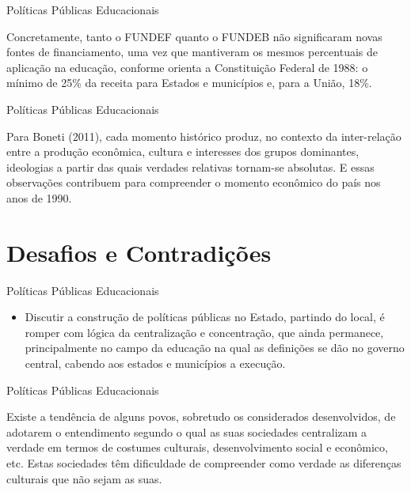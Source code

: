 \documentclass[12pt]{beamer}
\begin{document}
			\begin{frame}{Políticas Públicas Educacionais}
				\justifying
				
				Concretamente, tanto o FUNDEF quanto o FUNDEB não significaram
				novas fontes de financiamento, uma vez que mantiveram os mesmos percentuais
				de aplicação na educação, conforme orienta a Constituição Federal de 1988: o
				mínimo de 25\% da receita para Estados e municípios e, para a União, 18\%.
			\end{frame}
			
			\begin{frame}{Políticas Públicas Educacionais}
				\justifying
				
				Para Boneti (2011), cada momento histórico produz, no contexto da inter-relação entre a produção
				econômica, cultura e interesses dos grupos dominantes, ideologias a partir
				das quais verdades relativas tornam-se absolutas. E essas observações contribuem para compreender o momento
				econômico do país nos anos de 1990.
			\end{frame}
		
	\section{Desafios e Contradições}
	
		\begin{frame}{Políticas Públicas Educacionais}
			\begin{itemize}
				\item Discutir a construção de políticas públicas no Estado, partindo do local, é romper com lógica da centralização e concentração, que ainda permanece,
				principalmente no campo da educação na qual as definições se dão no governo
				central, cabendo aos estados e municípios a execução.
				
				
			\end{itemize}
		\end{frame}
		
		\begin{frame}{Políticas Públicas Educacionais}
			\justifying
			
			Existe a tendência de alguns povos, sobretudo os considerados desenvolvidos,
			de adotarem o entendimento segundo o qual as suas sociedades centralizam a
			verdade em termos de costumes culturais, desenvolvimento social e econômico,
			etc. Estas sociedades têm dificuldade de compreender como verdade as diferenças
			culturais que não sejam as suas.
		\end{frame}
		
\end{document}
